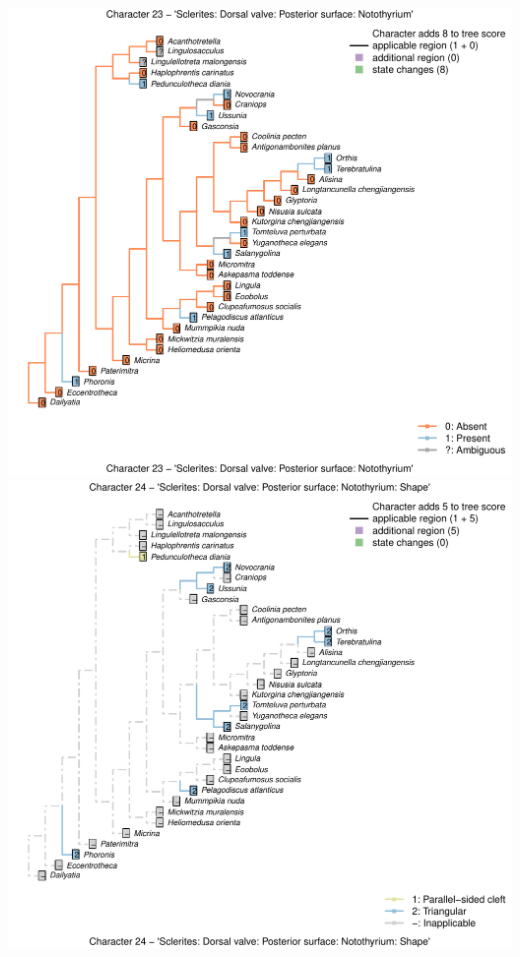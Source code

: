 \documentclass[]{book}
\theoremstyle{definition}
\theoremstyle{definition}
\theoremstyle{definition}
\theoremstyle{remark}
\begin{document}
\includegraphics{Brachiopod_phylogeny_files/figure-latex/unnamed-chunk-4-23.pdf}
\includegraphics{Brachiopod_phylogeny_files/figure-latex/unnamed-chunk-4-24.pdf}
\end{document}
